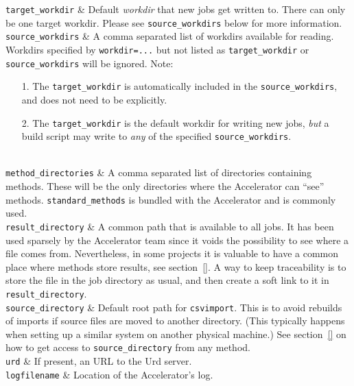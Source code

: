 \RPtwo \texttt{target\_workdir} & Default \textsl{workdir}
that new jobs get written to.  There can only be one target workdir.
Please see \texttt{source\_workdirs} below for more
information.\\[1ex]

\RPtwo \texttt{source\_workdirs} & A comma separated list of workdirs
available for reading.  Workdirs specified by \texttt{workdir=...}
but not listed as \texttt{target\_workdir}
or \texttt{source\_workdirs} will be ignored.  Note:
\begin{itemize}
  \item[1.] The \texttt{target\_workdir} is automatically included in
    the \texttt{source\_workdirs}, and does not need to be
    explicitly.
  \item[2.] The \texttt{target\_workdir} is the default
    workdir for writing new jobs, \textsl{but} a build script may write
    to \textsl{any} of the specified \texttt{source\_workdirs}.
\end{itemize}\\[1ex]

\RPtwo \texttt{method\_directories} & A comma separated list of
directories containing methods.  These will be the only directories
where the Accelerator can ``see'' methods.  \texttt{standard\_methods}
is bundled with the Accelerator and is commonly used.\\[1ex]

\RPtwo \texttt{result\_directory} & A common path that is available to all
jobs.  It has been used sparsely by the Accelerator team since it
voids the possibility to see where a file comes from.  Nevertheless,
in some projects it is valuable to have a common place where methods
store results, see section~\ref{}.  A way to keep traceability is to
store the file in the job directory as usual, and then create a soft
link to it in \texttt{result\_directory}.\\[1ex]

\RPtwo \texttt{source\_directory} & Default root path for
\texttt{csvimport}.  This is to avoid rebuilds of imports if source
files are moved to another directory.  (This typically happens when
setting up a similar system on another physical machine.)  See
section~\ref{} on how to get access to \texttt{source\_directory} from
any method.\\[1ex]

\RPtwo \texttt{urd} & If present, an URL to the Urd server.\\[1ex]

\RPtwo \texttt{logfilename} & Location of the Accelerator's log.\\[1ex]

